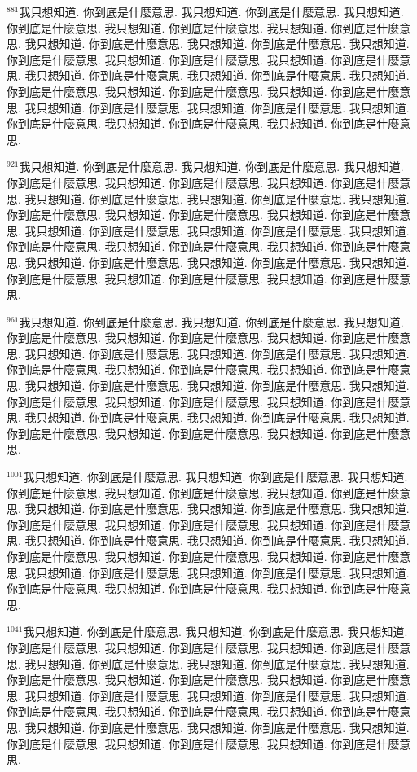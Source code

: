 \documentclass{book}
\begin{document}
$^{881}$我只想知道.
你到底是什麼意思.
我只想知道.
你到底是什麼意思.
我只想知道.
你到底是什麼意思.
我只想知道.
你到底是什麼意思.
我只想知道.
你到底是什麼意思.
我只想知道.
你到底是什麼意思.
我只想知道.
你到底是什麼意思.
我只想知道.
你到底是什麼意思.
我只想知道.
你到底是什麼意思.
我只想知道.
你到底是什麼意思.
我只想知道.
你到底是什麼意思.
我只想知道.
你到底是什麼意思.
我只想知道.
你到底是什麼意思.
我只想知道.
你到底是什麼意思.
我只想知道.
你到底是什麼意思.
我只想知道.
你到底是什麼意思.
我只想知道.
你到底是什麼意思.
我只想知道.
你到底是什麼意思.
我只想知道.
你到底是什麼意思.
我只想知道.
你到底是什麼意思.

$^{921}$我只想知道.
你到底是什麼意思.
我只想知道.
你到底是什麼意思.
我只想知道.
你到底是什麼意思.
我只想知道.
你到底是什麼意思.
我只想知道.
你到底是什麼意思.
我只想知道.
你到底是什麼意思.
我只想知道.
你到底是什麼意思.
我只想知道.
你到底是什麼意思.
我只想知道.
你到底是什麼意思.
我只想知道.
你到底是什麼意思.
我只想知道.
你到底是什麼意思.
我只想知道.
你到底是什麼意思.
我只想知道.
你到底是什麼意思.
我只想知道.
你到底是什麼意思.
我只想知道.
你到底是什麼意思.
我只想知道.
你到底是什麼意思.
我只想知道.
你到底是什麼意思.
我只想知道.
你到底是什麼意思.
我只想知道.
你到底是什麼意思.
我只想知道.
你到底是什麼意思.

$^{961}$我只想知道.
你到底是什麼意思.
我只想知道.
你到底是什麼意思.
我只想知道.
你到底是什麼意思.
我只想知道.
你到底是什麼意思.
我只想知道.
你到底是什麼意思.
我只想知道.
你到底是什麼意思.
我只想知道.
你到底是什麼意思.
我只想知道.
你到底是什麼意思.
我只想知道.
你到底是什麼意思.
我只想知道.
你到底是什麼意思.
我只想知道.
你到底是什麼意思.
我只想知道.
你到底是什麼意思.
我只想知道.
你到底是什麼意思.
我只想知道.
你到底是什麼意思.
我只想知道.
你到底是什麼意思.
我只想知道.
你到底是什麼意思.
我只想知道.
你到底是什麼意思.
我只想知道.
你到底是什麼意思.
我只想知道.
你到底是什麼意思.
我只想知道.
你到底是什麼意思.

$^{1001}$我只想知道.
你到底是什麼意思.
我只想知道.
你到底是什麼意思.
我只想知道.
你到底是什麼意思.
我只想知道.
你到底是什麼意思.
我只想知道.
你到底是什麼意思.
我只想知道.
你到底是什麼意思.
我只想知道.
你到底是什麼意思.
我只想知道.
你到底是什麼意思.
我只想知道.
你到底是什麼意思.
我只想知道.
你到底是什麼意思.
我只想知道.
你到底是什麼意思.
我只想知道.
你到底是什麼意思.
我只想知道.
你到底是什麼意思.
我只想知道.
你到底是什麼意思.
我只想知道.
你到底是什麼意思.
我只想知道.
你到底是什麼意思.
我只想知道.
你到底是什麼意思.
我只想知道.
你到底是什麼意思.
我只想知道.
你到底是什麼意思.
我只想知道.
你到底是什麼意思.

$^{1041}$我只想知道.
你到底是什麼意思.
我只想知道.
你到底是什麼意思.
我只想知道.
你到底是什麼意思.
我只想知道.
你到底是什麼意思.
我只想知道.
你到底是什麼意思.
我只想知道.
你到底是什麼意思.
我只想知道.
你到底是什麼意思.
我只想知道.
你到底是什麼意思.
我只想知道.
你到底是什麼意思.
我只想知道.
你到底是什麼意思.
我只想知道.
你到底是什麼意思.
我只想知道.
你到底是什麼意思.
我只想知道.
你到底是什麼意思.
我只想知道.
你到底是什麼意思.
我只想知道.
你到底是什麼意思.
我只想知道.
你到底是什麼意思.
我只想知道.
你到底是什麼意思.
我只想知道.
你到底是什麼意思.
我只想知道.
你到底是什麼意思.
我只想知道.
你到底是什麼意思.
\end{document}
